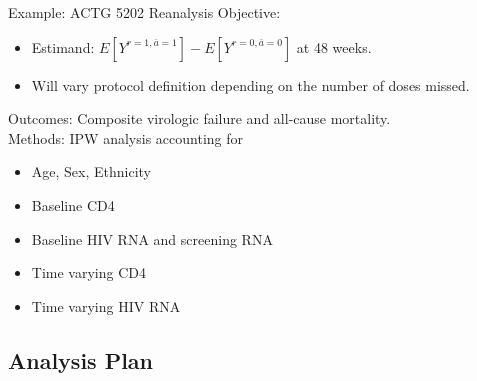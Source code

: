 \documentclass{beamer}
\begin{document}
    \begin{frame}{Example: ACTG 5202 Reanalysis}
            Objective:
        \begin{itemize}
            \item Estimand: $E\left[Y^{r=1,\bar{a}=1}\right]-E\left[Y^{r=0,\bar{a}=0}\right]$ at 48 weeks. %
            \item Will vary protocol definition depending on the number of doses missed.
        \end{itemize}
        \vspace{0.3cm}
        Outcomes: Composite virologic failure and all-cause mortality.\\        \vspace{0.3cm}
        Methods: IPW analysis accounting for
            \begin{itemize}
                        \item Age, Sex, Ethnicity
                        \item Baseline CD4
                        \item Baseline HIV RNA and screening RNA
                        \item Time varying CD4
                        \item Time varying HIV RNA
            \end{itemize}
    \end{frame}

\subsection{Analysis Plan}
\end{document}
